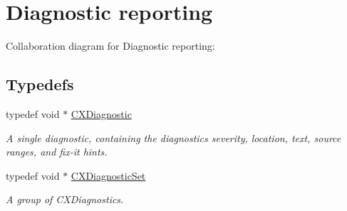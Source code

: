 \hypertarget{group__CINDEX__DIAG}{}\section{Diagnostic reporting}
\label{group__CINDEX__DIAG}
Collaboration diagram for Diagnostic reporting\+:
\subsection*{Typedefs}
\begin{DoxyCompactItemize}
\item 
\mbox{\label{group__CINDEX__DIAG_ga44bb8aba7c40590ad25d1763c4fbff7f}} 
typedef void $\ast$ \hyperlink{group__CINDEX__DIAG_ga44bb8aba7c40590ad25d1763c4fbff7f}{C\+X\+Diagnostic}
\begin{DoxyCompactList}\small\item\em A single diagnostic, containing the diagnostic\textquotesingle{}s severity, location, text, source ranges, and fix-\/it hints. \end{DoxyCompactList}\item 
\mbox{\label{group__CINDEX__DIAG_ga38dfc0ae45b55bf7fd577eed9148e244}} 
typedef void $\ast$ \hyperlink{group__CINDEX__DIAG_ga38dfc0ae45b55bf7fd577eed9148e244}{C\+X\+Diagnostic\+Set}
\begin{DoxyCompactList}\small\item\em A group of C\+X\+Diagnostics. \end{DoxyCompactList}\end{DoxyCompactItemize}
